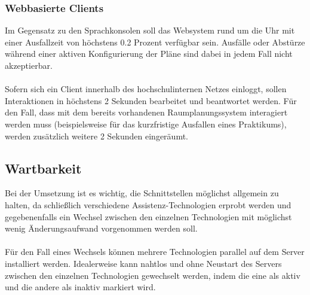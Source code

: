 \documentclass[12pt, a4paper]{scrartcl}
\begin{document}
\subsubsection{Webbasierte Clients}
Im Gegensatz zu den Sprachkonsolen soll das Websystem rund um die Uhr mit einer Ausfallzeit von höchstens 0.2 Prozent verfügbar sein. Ausfälle oder Abstürze während einer aktiven Konfigurierung der Pläne sind dabei in jedem Fall nicht akzeptierbar.\\
\\
Sofern sich ein Client innerhalb des hochschulinternen Netzes einloggt, sollen Interaktionen in höchstens 2 Sekunden bearbeitet und beantwortet werden. Für den Fall, dass mit dem bereits vorhandenen Raumplanungssystem interagiert werden muss (beispielsweise für das kurzfristige Ausfallen eines Praktikums), werden zusätzlich weitere 2 Sekunden eingeräumt.

\subsection{Wartbarkeit}
Bei der Umsetzung ist es wichtig, die Schnittstellen möglichst allgemein zu halten, da schließlich verschiedene Assistenz-Technologien erprobt werden und gegebenenfalls ein Wechsel zwischen den einzelnen Technologien mit möglichst wenig Änderungsaufwand vorgenommen werden soll.\\
\\
Für den Fall eines Wechsels können mehrere Technologien parallel auf dem Server installiert werden. Idealerweise kann nahtlos und ohne Neustart des Servers zwischen den einzelnen Technologien gewechselt werden, indem die eine als aktiv und die andere als inaktiv markiert wird.   
\end{document}
